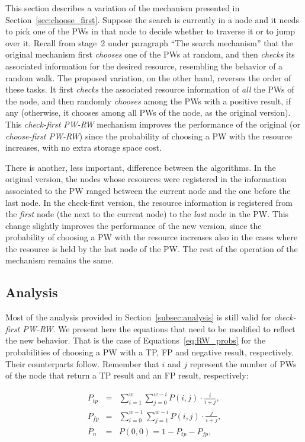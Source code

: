 \documentclass[]{elsarticle}
\newcommand{\pn} 	{\ensuremath{P_n}}
\newcommand{\ps} 	{\ensuremath{P_{\!t\!p}}}
\newcommand{\pf} 	{\ensuremath{P_{\!f\!p}}}
\begin{document}
This section describes a variation of the mechanism presented in Section~\ref{sec:choose_first}. Suppose the search is currently in a node and it needs to pick one of the PWs in that node to decide whether to traverse it or to jump over it. Recall from stage~2 under paragraph ``The search mechanism'' that the original mechanism first \emph{chooses} one of the PWs at random, and then \emph{checks} its associated information for the desired resource, resembling the behavior of a random walk. The proposed variation, on the other hand, reverses the order of these tasks. It first \emph{checks} the associated resource information of \emph{all} the PWs of the node, and then randomly \emph{chooses} among the PWs with a positive result, if any (otherwise, it chooses among all PWs of the node, as the original version). This \emph{check-first PW-RW} mechanism improves the performance of the original (or \emph{choose-first PW-RW}) since the probability of choosing a PW with the resource increases, with no extra storage space cost.

There is another, less important, difference between the algorithms. In the original version, the nodes whose resources were registered in the information associated to the PW ranged between the current node and the one before the last node. In the check-first version, the resource information is registered from the \emph{first} node (the next to the current node) to the \emph{last} node in the PW. This change slightly improves the performance of the new version, since the probability of choosing a PW with the resource increases also in the cases where the resource is held by the last node of the PW. The rest of the operation of the mechanism remains the same. 

\subsection{Analysis}

Most of the analysis provided in Section~\ref{subsec:analysis} is still valid for \emph{check-first PW-RW}. We present here the equations that need to be modified to reflect the new behavior. That is the case of Equations~\ref{eq:RW_probs} for the probabilities of choosing a PW with a TP, FP and negative result, respectively. Their counterparts follow. Remember that $i$ and $j$ represent the number of PWs of the node that return a TP result and an FP result, respectively:

\begin{eqnarray}
  \ps & = & \sum_{i=1}^{w} \sum_{j=0}^{w-i} P(i,j)\cdot \frac{i}{i+j}, \nonumber \\
  \pf & = & \sum_{i=0}^{w-1} \sum_{j=1}^{w-i} P(i,j)\cdot \frac{j}{i+j}, \nonumber \\
  \pn & = & P(0,0) = 1-\ps-\pf, 
 \label{eq:RW_probs_checkfirst}
\end{eqnarray}
\end{document}
